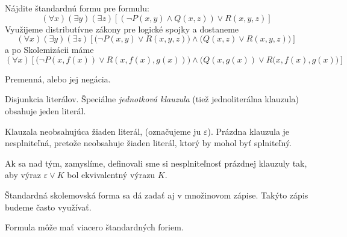 \begin{priklad}
    Nájdite štandardnú formu pre formulu:
    \begin{equation*}
        (\forall x)(\exists y) (\exists z) 
        \left[ (\neg P(x,y) \land Q(x,z))\lor R(x,y,z)\right]
    \end{equation*}
    Využijeme distributívne zákony pre logické spojky a dostaneme
    \begin{equation*}
        (\forall x) (\exists y) (\exists z)
        \left[ \Big(\neg P(x,y) \lor R(x,y,z)\Big) \land
            \Big(Q(x,z)\lor R(x,y,z)\Big)\right]
    \end{equation*}
    a po Skolemizácii máme
    \begin{equation*}
        (\forall x) \left[
            \Big(\neg P(x,f(x)) \lor R(x,f(x),g(x)) \Big) \land
            \Big( Q(x,g(x))\lor R(x,f(x),g(x) \Big) \right]
    \end{equation*}
\end{priklad}


\begin{definicia}[Literál]
    Premenná, alebo jej negácia.
\end{definicia}
\begin{definicia}[Klauzula]
    Disjunkcia literálov.
    Špeciálne \emph{jednotková klauzula} (tiež jednoliterálna klauzula)
    obsahuje jeden literál. 
\end{definicia}

\begin{definicia}
    Klauzala neobsahujúca žiaden literál, (označujeme ju $\varepsilon$).
    Prázdna klauzula je nesplniteľná, pretože neobsahuje žiaden
    literál, ktorý by mohol byť splniteľný.    
\end{definicia}
\begin{poznamka}
    Ak sa nad tým, zamyslíme, definovali sme si nesplniteľnosť
    prázdnej klauzuly tak, aby výraz $\varepsilon \lor K$ bol
    ekvivalentný výrazu $K$.
\end{poznamka}

\begin{poznamka}
    Štandardná skolemovská forma sa dá zadať aj v množinovom zápise.
    Takýto zápis budeme často využívať.
\end{poznamka}

\begin{poznamka}
    Formula môže mať viacero štandardných foriem.
\end{poznamka}

